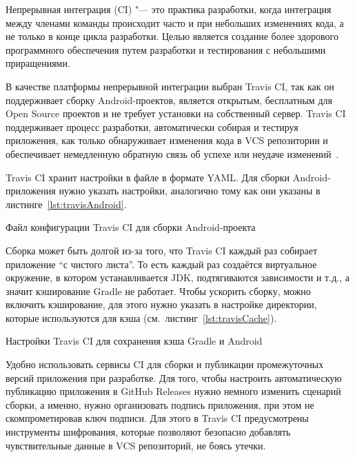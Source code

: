 Непрерывная интеграция (CI) "--- это практика разработки, когда интеграция между членами команды происходит часто и при небольших изменениях кода, а не только в конце цикла разработки.
Целью является создание более здорового программного обеспечения путем разработки и тестирования с небольшими приращениями.

В качестве платформы непрерывной интеграции выбран Travis CI, так как он поддерживает сборку Android-проектов, является открытым, бесплатным для Open Source проектов и не требует установки на собственный сервер.
Travis CI поддерживает процесс разработки, автоматически собирая и тестируя приложения, как только обнаруживает изменения кода в VCS репозитории и обеспечивает немедленную обратную связь об успехе или неудаче изменений~\cite{travis:docs}.

Travis CI хранит настройки в файле  в формате YAML\@.
Для сборки Android-приложения нужно указать настройки, аналогично тому как они указаны в листинге~\ref{lst:travisAndroid}.

\begin{listing}[h]
  \caption{Файл конфигурации Travis CI для сборки Android-проекта}
  \label{lst:travisAndroid}
\end{listing}

Сборка может быть долгой из-за того, что Travis CI каждый раз собирает приложение ``с чистого листа''.
То есть каждый раз создаётся виртуальное окружение, в котором устанавливается JDK, подтягиваются зависимости и т.д., а значит кэширование Gradle не работает.
Чтобы ускорить сборку, можно включить кэширование, для этого нужно указать в настройке  директории, которые используются для кэша (см.~листинг~\ref{lst:travisCache}).

\begin{listing}[h]
  \caption{Настройки Travis CI для сохранения кэша Gradle и Android}
  \label{lst:travisCache}
\end{listing}

Удобно использовать сервисы CI для сборки и публикации промежуточных версий приложения при разработке.
Для того, чтобы настроить автоматическую публикацию приложения в GitHub Releases нужно немного изменить сценарий сборки, а именно, нужно организовать подпись приложения, при этом не скомпрометировав ключ подписи.
Для этого в Travis CI предусмотрены инструменты шифрования, которые позволяют безопасно добавлять чувствительные данные в VCS репозиторий, не боясь утечки.

